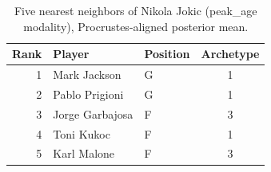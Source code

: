 \begin{table}[htbp]
  \centering\small
  \begin{tabular}{rllc}
    \toprule
    Rank & Player & Position & Archetype \\
    \midrule
    1 & Mark Jackson & G & 1 \\
    2 & Pablo Prigioni & G & 1 \\
    3 & Jorge Garbajosa & F & 3 \\
    4 & Toni Kukoc & F & 1 \\
    5 & Karl Malone & F & 3 \\
    \bottomrule
  \end{tabular}
  \caption{Five nearest neighbors of Nikola Jokic (peak_age modality), Procrustes-aligned posterior mean.}
  \label{tab:Nikola_Jokic_neighbors_peak_age}
\end{table}

